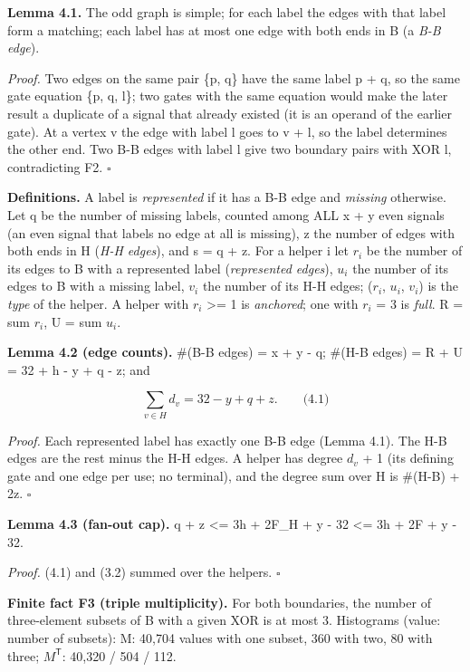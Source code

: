 \textbf{Lemma 4.1.} The odd graph is simple; for each label the edges with that label form a matching; each label has at most one edge with both ends in B (a \emph{B-B edge}).

\emph{Proof.} Two edges on the same pair \{p, q\} have the same label p + q, so the same gate equation \{p, q, l\}; two gates with the same equation would make the later result a duplicate of a signal that already existed (it is an operand of the earlier gate). At a vertex v the edge with label l goes to v + l, so the label determines the other end. Two B-B edges with label l give two boundary pairs with XOR l, contradicting F2. \(\square\)

\textbf{Definitions.} A label is \emph{represented} if it has a B-B edge and \emph{missing} otherwise. Let q be the number of missing labels, counted among ALL x + y even signals (an even signal that labels no edge at all is missing), z the number of edges with both ends in H (\emph{H-H edges}), and s = q + z. For a helper i let \(r_i\) be the number of its edges to B with a represented label (\emph{represented edges}), \(u_i\) the number of its edges to B with a missing label, \(v_i\) the number of its H-H edges; (\(r_i\), \(u_i\), \(v_i\)) is the \emph{type} of the helper. A helper with \(r_i\) \textgreater= 1 is \emph{anchored}; one with \(r_i\) = 3 is \emph{full}. R = sum \(r_i\), U = sum \(u_i\).

\textbf{Lemma 4.2 (edge counts).} \#(B-B edges) = x + y - q; \#(H-B edges) = R + U = 32 + h - y + q - z; and

\[
\sum_{v\in H}d_v=32-y+q+z.\qquad\text{(4.1)}
\]

\emph{Proof.} Each represented label has exactly one B-B edge (Lemma 4.1). The H-B edges are the rest minus the H-H edges. A helper has degree \(d_v\) + 1 (its defining gate and one edge per use; no terminal), and the degree sum over H is \#(H-B) + 2z. \(\square\)

\textbf{Lemma 4.3 (fan-out cap).} q + z \textless= 3h + 2F\_H + y - 32 \textless= 3h + 2F + y - 32.

\emph{Proof.} (4.1) and (3.2) summed over the helpers. \(\square\)

\textbf{Finite fact F3 (triple multiplicity).} For both boundaries, the number of three-element subsets of B with a given XOR is at most 3. Histograms (value: number of subsets): M: 40,704 values with one subset, 360 with two, 80 with three; \(M^{\mathsf T}\): 40,320 / 504 / 112.

